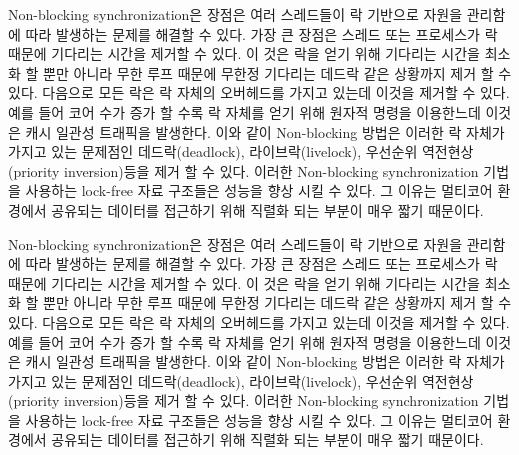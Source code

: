 
Non-blocking synchronization은 장점은 여러 스레드들이 락 기반으로 자원을 관리함에 따라
 발생하는 문제를 해결할 수 있다. 
가장 큰 장점은 스레드 또는 프로세스가 락 때문에 기다리는 시간을 제거할 수 있다.
이 것은 락을 얻기 위해 기다리는 시간을 최소화 할 뿐만 아니라 무한 루프 때문에 무한정 기다리는 
데드락 같은 상황까지 제거 할 수 있다. 
다음으로 모든 락은 락 자체의 오버헤드를 가지고 있는데 이것을 제거할 수 있다. 
예를 들어 코어 수가 증가 할 수록 락 자체를 얻기 위해 원자적 명령을 이용한느데 이것은 캐시 일관성 트래픽을 
발생한다. 
이와 같이 Non-blocking 방법은 이러한 락 자체가 가지고 있는 문제점인 데드락(deadlock), 라이브락(livelock), 
우선순위 역전현상(priority inversion)등을 제거 할 수 있다. 
이러한 Non-blocking synchronization 기법을 사용하는 lock-free 자료 구조들은 성능을 향상 시킬 수 있다. 
그 이유는 멀티코어 환경에서 공유되는 데이터를 접근하기 위해 직렬화 되는 부분이 매우 짧기 때문이다. 




Non-blocking synchronization은 장점은 여러 스레드들이 락 기반으로 자원을 관리함에 따라
 발생하는 문제를 해결할 수 있다. 
가장 큰 장점은 스레드 또는 프로세스가 락 때문에 기다리는 시간을 제거할 수 있다.
이 것은 락을 얻기 위해 기다리는 시간을 최소화 할 뿐만 아니라 무한 루프 때문에 무한정 기다리는 
데드락 같은 상황까지 제거 할 수 있다. 
다음으로 모든 락은 락 자체의 오버헤드를 가지고 있는데 이것을 제거할 수 있다. 
예를 들어 코어 수가 증가 할 수록 락 자체를 얻기 위해 원자적 명령을 이용한느데 이것은 캐시 일관성 트래픽을 
발생한다. 
이와 같이 Non-blocking 방법은 이러한 락 자체가 가지고 있는 문제점인 데드락(deadlock), 라이브락(livelock), 
우선순위 역전현상(priority inversion)등을 제거 할 수 있다. 
이러한 Non-blocking synchronization 기법을 사용하는 lock-free 자료 구조들은 성능을 향상 시킬 수 있다. 
그 이유는 멀티코어 환경에서 공유되는 데이터를 접근하기 위해 직렬화 되는 부분이 매우 짧기 때문이다. 


